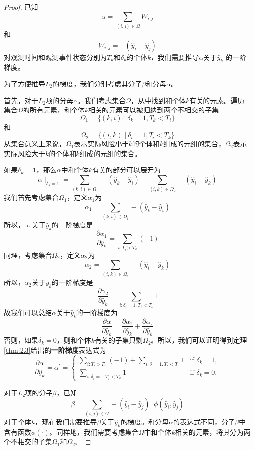 \begin{proof}
已知$$\alpha = \sum_{(i,j)\in \Omega} W_{i,j}$$ 和 $$W_{i,j}=-(\hat{y}_i-\hat{y}_j)$$对观测时间和观测事件状态分别为$T_k$和$\delta_k$的个体$k$，我们需要推导$\alpha$关于$\hat{y}_k$ 的一阶梯度。

为了方便推导$L_2$的梯度，我们分别考虑其分子$\beta$和分母$\alpha$。

首先，对于$L_2$项的分母$\alpha$。我们考虑集合$\Omega$，从中找到和个体$k$有关的元素。遍历集合$\Omega$的所有元素，和个体$k$相关的元素可以被归纳到两个不相交的子集$$\Omega_1=\{(k,i) \mid \delta_k=1,T_k < T_i\}$$ 和 $$\Omega_2=\{(i,k) \mid \delta_i=1,T_i < T_k\}$$ 从集合意义上来说，$\Omega_1$表示实际风险小于$k$的个体和$k$组成的元组的集合，$\Omega_2$表示实际风险大于$k$的个体和$k$组成的元组的集合。

如果$\delta_k = 1$，那么$\alpha$中和个体$k$有关的部分可以展开为$$\alpha \mid_{\delta_k=1}=\sum_{(k,i)\in \Omega_1} -(\hat{y}_k-\hat{y}_i) + \sum_{(i,k)\in \Omega_2} -(\hat{y}_i-\hat{y}_k) $$ 我们首先考虑集合$\Omega_1$，定义$\alpha_1$为$$\alpha_1 = \sum_{(k,i)\in \Omega_1} -(\hat{y}_k-\hat{y}_i)$$ 所以，$\alpha_1$关于$\hat{y}_k$的一阶梯度是$$\frac{\partial \alpha_1}{\partial \hat{y}_k} = \sum\limits_{i: T_i>T_k}(-1)$$ 同理，考虑集合$\Omega_2$，定义$\alpha_2$为$$\alpha_2 = \sum_{(i,k)\in \Omega_2} -(\hat{y}_i-\hat{y}_k)$$ 所以，$\alpha_2$关于$\hat{y}_k$的一阶梯度是$$\frac{\partial \alpha_2}{\partial \hat{y}_k} = \sum\limits_{i: \delta_i=1,T_i<T_k} 1$$ 故我们可以总结$\alpha$关于$\hat{y}_k$的一阶梯度为$$\frac{\partial \alpha}{\partial \hat{y}_k} = \frac{\partial \alpha_1}{\partial \hat{y}_k} + \frac{\partial \alpha_2}{\partial \hat{y}_k}$$ 否则，如果$\delta_k = 0$，则和个体$k$有关的子集只剩$\Omega_2$。所以，我们可以证明得到定理\ref{thm:2.3}给出的\textbf{一阶梯度}表达式为$$
\frac{\partial \alpha}{\partial \hat{y}_k}=\alpha^{'}=
\begin{cases}
\sum\limits_{i: T_i>T_k}(-1) + \sum\limits_{i: \delta_i=1,T_i<T_k} 1 & \text{if } \delta_k = 1,\\
\sum\limits_{i: \delta_i=1,T_i<T_k} 1 & \text{if } \delta_k = 0.
\end{cases}
$$

对于$L_2$项的分子$\beta$，已知$$\beta = \sum_{(i,j)\in \Omega} -(\hat{y}_i-\hat{y}_j) \cdot \phi(\hat{y}_i, \hat{y}_j)$$ 对于个体$k$，现在我们需要推导$\beta$关于$\hat{y}_k$的梯度。和分母$\alpha$的表达式不同，分子$\beta$中含有函数$\phi(\cdot)$。同样地，我们需要考虑集合$\Omega$中和个体$k$相关的元素，将其分为两个不相交的子集$\Omega_1$和$\Omega_2$。


\end{proof}
